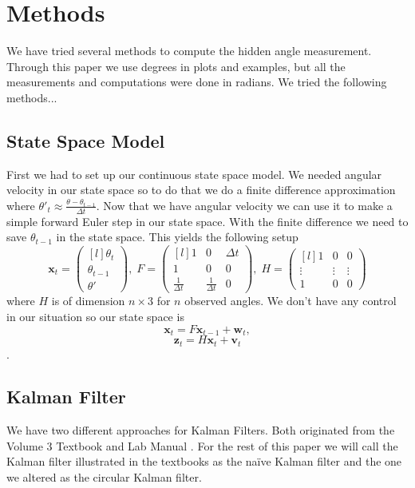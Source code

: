 \documentclass[11pt]{amsart}
\begin{document}
\section{Methods}
We have tried several methods to compute the hidden angle measurement. Through this paper we use degrees in plots and examples, but all the measurements and computations were done in radians. We tried the following methods...

\subsection{State Space Model}
First we had to set up our continuous state space model. We needed angular velocity in our state space so to do that we do a finite difference approximation 
where $\theta'_t \approx \frac{\theta - \theta_{t-1}}{\Delta t}$. Now that we have angular velocity we can use it to make a simple forward Euler step in our state 
space. With the finite difference we need to save $\theta_{t-1}$ in the state space. This yields the following setup
\[\mathbf{x}_t = \begin{pmatrix*}[l]
    \theta_t \\
    \theta_{t-1} \\
    \theta'
\end{pmatrix*},\;  
F = \begin{pmatrix*}[l]
    1 & 0 & \Delta t \\
    1 & 0 & 0 \\
    \frac{1}{\Delta t} & \frac{1}{\Delta t} & 0
\end{pmatrix*},\;
H = \begin{pmatrix*}[l]
    1 & 0 & 0 \\
    \vdots & \vdots & \vdots\\
    1 & 0 & 0

\end{pmatrix*}\]
 where $H$ is of dimension $n\times3$ for $n$ observed angles. We don't have any control in our situation so our state space is
 \[\mathbf{x}_t = F\mathbf{x}_{t-1} + \mathbf{w}_t,\]
\[\mathbf{z}_t = H\mathbf{x}_t + \mathbf{v}_t\].

\subsection{Kalman Filter}
We have two different approaches for Kalman Filters. Both originated from the Volume 3 Textbook \cite{V3} and Lab Manual \cite{V3 Lab Manual}. For the rest of this paper we will call the Kalman filter 
illustrated in the textbooks as the naïve Kalman filter and the one we altered as the circular Kalman filter.
\end{document}
